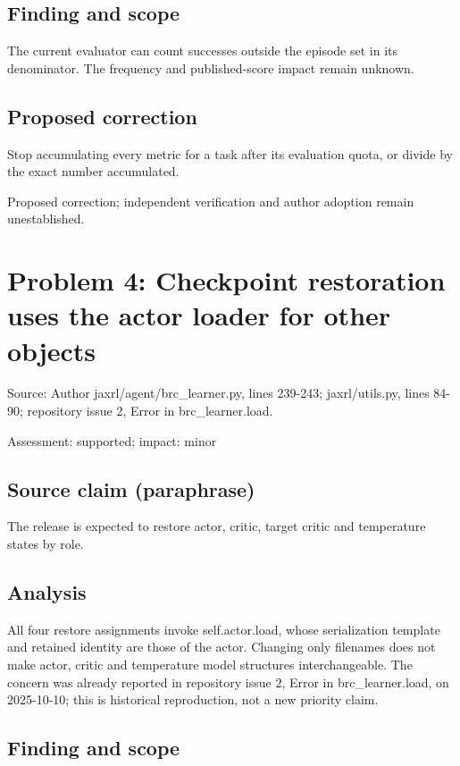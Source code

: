 \documentclass[11pt]{article}
\begin{document}
\subsection*{Finding and scope}

The current evaluator can count successes outside the episode set in its denominator. The frequency and published-score impact remain unknown.

\subsection*{Proposed correction}

Stop accumulating every metric for a task after its evaluation quota, or divide by the exact number accumulated.

Proposed correction; independent verification and author adoption remain unestablished.

\section*{Problem 4: Checkpoint restoration uses the actor loader for other objects}

Source: Author jaxrl/agent/brc\_learner.py, lines 239-243; jaxrl/utils.py, lines 84-90; repository issue 2, Error in brc\_learner.load.

Assessment: supported; impact: minor

\subsection*{Source claim (paraphrase)}

The release is expected to restore actor, critic, target critic and temperature states by role.

\subsection*{Analysis}

All four restore assignments invoke self.actor.load, whose serialization template and retained identity are those of the actor. Changing only filenames does not make actor, critic and temperature model structures interchangeable. The concern was already reported in repository issue \(2\), Error in brc\_learner.load, on 2025-10-10; this is historical reproduction, not a new priority claim.

\subsection*{Finding and scope}
\end{document}
